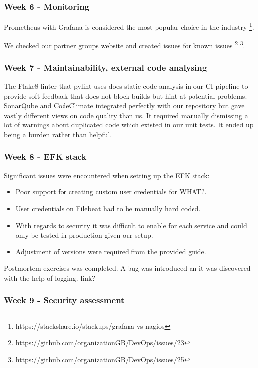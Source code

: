 \documentclass{article}
\begin{document}
\subsubsection{Week 6 - Monitoring }

Prometheus with Grafana is considered the most popular choice in the industry \footnote{https://stackshare.io/stackups/grafana-vs-nagios}. 

We checked our partner groups website and created issues for known issues \footnote{\url{https://github.com/organizationGB/DevOps/issues/23}} \footnote{\url{https://github.com/organizationGB/DevOps/issues/25}}. 


\subsubsection{Week 7 - Maintainability, external code analysing }

The Flake8 linter that pylint uses does static code analysis in our CI pipeline to provide soft feedback that does not block builds but hint at potential problems. SonarQube and CodeClimate integrated perfectly with our repository but gave vastly different views on code quality than us. It required manually dismissing a lot of warnings about duplicated code which existed in our unit tests. It ended up being a burden rather than helpful.

\subsubsection{Week 8 - EFK stack}

Significant issues were encountered when setting up the EFK stack:

\begin{itemize}
    \item Poor support for creating custom user credentials for WHAT?.
    \item User credentials on Filebeat had to be manually hard coded.
    \item With regards to security it was difficult to enable for each service and could only be tested in production given our setup. 
    \item Adjustment of versions were required from the provided guide. 
\end{itemize}

Postmortem exercises was completed. A bug was introduced an it was discovered with the help of logging. link?

\subsubsection{Week 9 - Security  assessment}
\end{document}
